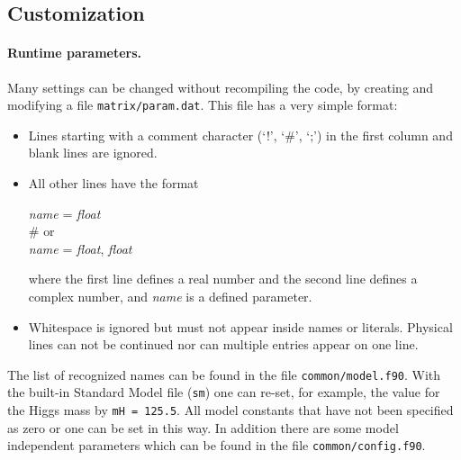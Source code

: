 \documentclass[11pt,a4paper]{refrep}
\begin{document}
\subsection{Customization}
\paragraph{Runtime parameters.}
Many settings can be changed without recompiling the code, by
creating and modifying a file \texttt{matrix/param.dat}.
This file has a very simple format:
\begin{itemize}
\item Lines starting with a comment character (`!', `\#', `;')
      in the first column and blank lines are ignored.
\item All other lines have the format
\begin{example}
\textit{name} = \textit{float}\\
\# \textrm{or}\\
\textit{name} = \textit{float}, \textit{float}
\end{example}
      where the first line defines a real number and the second
      line defines a complex number, and \textit{name} is a defined
      parameter.
\item Whitespace is ignored but must not appear inside names or
      literals. Physical lines can not be continued nor can
      multiple entries appear on one line.
\end{itemize}
The list of recognized names can be found in the file
\texttt{common/model.f90}. 
With the built-in Standard Model file (\texttt{sm}) one
can re-set, for example, the value for the Higgs mass by 
{\tt mH = 125.5}.
All model constants that have not been specified as zero or one
can be set in this way. 
In addition there are some model independent parameters which can be found in the file 
\texttt{common/config.f90}.
\end{document}

